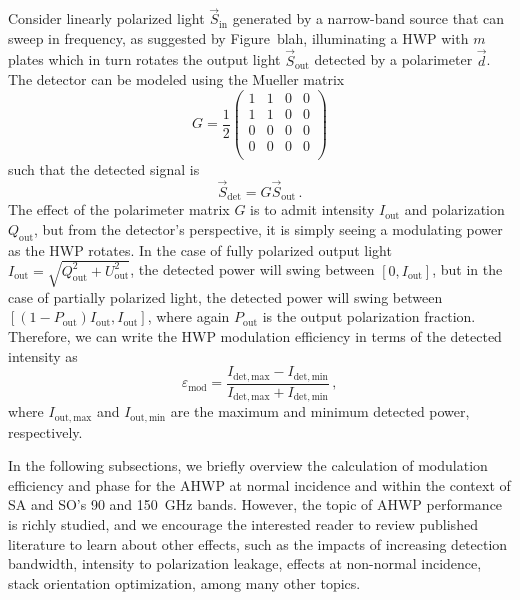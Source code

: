 Consider linearly polarized light $\vec{S}_{\mathrm{in}}$ generated by a narrow-band source that can sweep in frequency, as suggested by Figure~blah, illuminating a HWP with $m$ plates which in turn rotates the output light $\vec{S}_{\mathrm{out}}$ detected by a polarimeter $\vec{d}$. The detector can be modeled using the Mueller matrix
\begin{equation}
    G
    =
    \frac{1}{2}
    \begin{pmatrix}
    1 & 1 & 0 & 0 \\
    1 & 1 & 0 & 0 \\
    0 & 0 & 0 & 0 \\
    0 & 0 & 0 & 0 \\
    \end{pmatrix}
    \label{eq:detector_mueller_matrix}
\end{equation}
such that the detected signal is
\begin{equation}
    \vec{S}_{\mathrm{det}} = G \vec{S}_{\mathrm{out}} \, .
    \label{eq:detected_modulated_power}
\end{equation}
The effect of the polarimeter matrix $G$ is to admit intensity $I_{\mathrm{out}}$ and polarization $Q_{\mathrm{out}}$, but from the detector's perspective, it is simply seeing a modulating power as the HWP rotates. In the case of fully polarized output light $I_{\mathrm{out}} = \sqrt{Q_{\mathrm{out}}^{2} + U_{\mathrm{out}}^{2}}$, the detected power will swing between $[0, I_{\mathrm{out}}]$, but in the case of partially polarized light, the detected power will swing between $[(1 - P_{\mathrm{out}}) I_{\mathrm{out}}, I_{\mathrm{out}}]$, where again $P_{\mathrm{out}}$ is the output polarization fraction. Therefore, we can write the HWP modulation efficiency in terms of the detected intensity as
\begin{equation}
    \varepsilon_{\mathrm{mod}} = \frac{I_{\mathrm{det, max}} - I_{\mathrm{det, min}}}{I_{\mathrm{det, max}} + I_{\mathrm{det, min}}} \, ,
\end{equation}
where $I_{\mathrm{out, max}}$ and $I_{\mathrm{out, min}}$ are the maximum and minimum detected power, respectively.

In the following subsections, we briefly overview the calculation of modulation efficiency and phase for the AHWP at normal incidence and within the context of SA and SO's 90 and 150~GHz bands. However, the topic of AHWP performance is richly studied, and we encourage the interested reader to review published literature to learn about other effects, such as the impacts of increasing detection bandwidth, intensity to polarization leakage, effects at non-normal incidence, stack orientation optimization, among many other topics.

